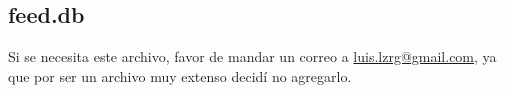 \subsection{feed.db}
\label{appe:base}

Si se necesita este archivo, favor de mandar un correo a \href{mailto:luis.lzrg@gmail.com}{luis.lzrg@gmail.com}, ya que por ser un archivo muy extenso decidí no agregarlo.